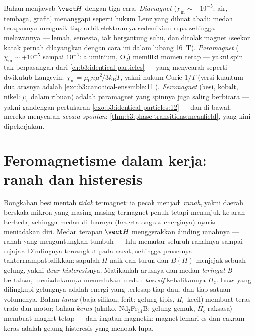 \begin{remark}\label{rem:b3:electromagnetism-in-matter:zoo}
Bahan menjawab $\vect H$ dengan tiga cara.
\emph{Diamagnet} ($\chi_{\text{m}} \sim -10^{-5}$: air, tembaga,
grafit) menanggapi seperti hukum Lenz yang dibuat abadi: medan terapannya
mengusik tiap orbit elektronnya sedemikian rupa sehingga melawannya ---
lemah, semesta, tak bergantung suhu, dan ditolak magnet (seekor katak
pernah dilayangkan dengan cara ini dalam lubang \qty{16}{T}).
\emph{Paramagnet} ($\chi_{\text{m}} \sim +10^{-5}$ sampai $10^{-3}$:
aluminium, O$_2$) memiliki momen tetap --- yakni spin tak berpasangan dari
\cref{ch:b3:identical-particles} --- yang menyearah seperti dwikutub
Langevin: $\chi_{\text{m}} = \mu_0 n\mu^2/3k_{\text{B}}T$, yakni hukum
Curie $1/T$ (versi kuantum dua arasnya adalah
\cref{exo:b3:canonical-ensemble:11}).
\emph{Feromagnet} (besi, kobalt, nikel: $\mu_{\text{r}}$ dalam
ribuan) adalah paramagnet yang spinnya juga saling berbicara ---
yakni gandengan pertukaran \cref{exo:b3:identical-particles:12} ---
dan di bawah  mereka menyearah \emph{secara spontan}:
\cref{thm:b3:phase-transitions:meanfield}, yang kini dipekerjakan.
\end{remark}

\section{Feromagnetisme dalam kerja: ranah dan histeresis}

\begin{definition}\label{def:b3:electromagnetism-in-matter:hysteresis}
Bongkahan besi mentah \emph{tidak} termagnet: ia pecah menjadi
\emph{ranah}, yakni daerah berskala mikron yang masing-masing termagnet
penuh tetapi menunjuk ke arah berbeda, sehingga medan di luarnya (beserta
ongkos energinya) nyaris meniadakan diri. Medan terapan $\vect H$
menggerakkan dinding ranahnya --- ranah yang menguntungkan tumbuh ---
lalu memutar seluruh ranahnya sampai sejajar. Dindingnya tersangkut pada
cacat, sehingga prosesnya taktermampatbalikkan: sapulah
$H$ naik dan turun dan $B(H)$ menjejak sebuah gelung, yakni \emph{daur histeresis}nya. Matikanlah arusnya dan medan \emph{teringat}
$B_{\text{r}}$ bertahan; meniadakannya memerlukan medan \emph{koersif}
kebalikannya $H_{\text{c}}$. Luas yang dilingkupi gelungnya adalah
energi yang terlesap tiap daur dan tiap satuan volumenya. Bahan
\emph{lunak} (baja silikon, ferit: gelung tipis, $H_{\text{c}}$ kecil)
membuat teras trafo dan motor; bahan \emph{keras}
(alniko, Nd$_2$Fe$_{14}$B: gelung gemuk, $H_{\text{c}}$ raksasa) membuat
magnet tetap --- dan ingatan magnetik: magnet lemari es dan cakram keras
adalah gelung histeresis yang menolak lupa.
\end{definition}

